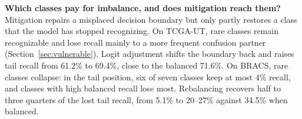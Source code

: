 \documentclass[11pt]{article}
\begin{document}
\smallskip\noindent\textbf{Which classes pay for imbalance, and does mitigation reach them?}
Mitigation repairs a misplaced decision boundary but only partly restores a class that the model has stopped recognizing. On TCGA-UT, rare classes remain recognizable and lose recall mainly to a more frequent confusion partner (Section~\ref{sec:vulnerable}). Logit adjustment shifts the boundary back and raises tail recall from 61.2\% to 69.4\%, close to the balanced 71.6\%. On BRACS, rare classes collapse: in the tail position, six of seven classes keep at most 4\% recall, and classes with high balanced recall lose most. Rebalancing recovers half to three quarters of the lost tail recall, from 5.1\% to 20--27\% against 34.5\% when balanced.
\clearpage


\end{document}
